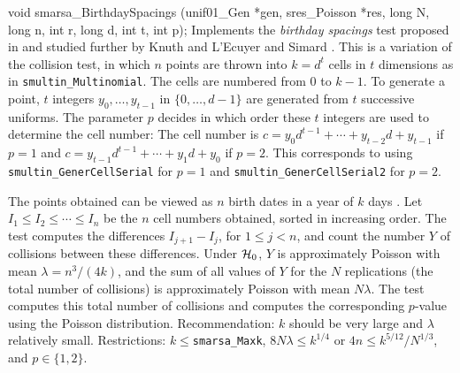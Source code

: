 void smarsa_BirthdaySpacings (unif01_Gen *gen, sres_Poisson *res,
                              long N, long n, int r, long d, int t, int p);
\endcode
 \tab
   Implements the {\em birthday spacings\/} test proposed in \cite{rMAR85a}
   and studied further by Knuth \cite{rKNU98a} and
   L'Ecuyer and Simard \cite{rLEC01a}.
   This is a variation of the collision test, in which
   $n$ points are thrown into $k = d^t$ cells in $t$ dimensions as in
   {\tt smultin\_Multinomial}.
   The cells are numbered from 0 to $k-1$.
   To generate a point, $t$ integers $y_0,\dots,y_{t-1}$ in $\{0,\dots,d-1\}$
   are generated from $t$ successive uniforms.
   The parameter $p$ decides in which order these $t$ integers are used
   to determine the cell number: The cell number is
   $c = y_0 d^{t-1} + \cdots + y_{t-2} d + y_{t-1}$ if $p=1$ and
   $c = y_{t-1} d^{t-1} + \cdots + y_{1} d + y_0$ if $p=2$.
   This corresponds to using {\tt smultin\_GenerCellSerial} for $p=1$
   and {\tt smultin\_GenerCellSerial2} for $p=2$.

   The points obtained can be viewed as
   $n$ birth dates in a year of $k$ days \cite {rALT88a,rMAR85a}.
   Let $I_1 \le I_2\le \cdots \le I_n$ be the $n$ cell numbers obtained,
   sorted in increasing order. The test computes the differences
   $I_{j+1} - I_{j}$, for $1\le j < n$,
   and  count the  number $Y$ of collisions between these differences.
   Under $\mathcal{H}_0$, $Y$ is approximately Poisson with mean
   $\lambda = n^3/(4k)$, and the sum of all values of $Y$ for the
   $N$ replications (the total number of  collisions) is
   approximately Poisson with mean $N\lambda$.
   The test computes this total number of collisions and computes the
   corresponding $p$-value using the Poisson distribution.
   Recommendation: $k$ should be very large and $\lambda$ relatively small.
   Restrictions: $k \le {}${\tt smarsa\_Maxk},
   $8 N \lambda \le k^{1/4}$ or $4n \le k^{5/12}/ N^{1/3}$, and
   $p\in \{1, 2\}$.
 \endtab
\code


